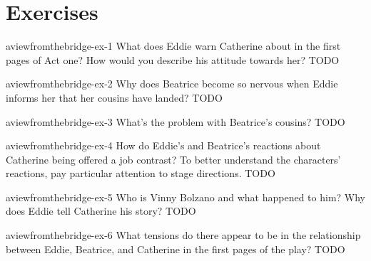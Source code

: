 \documentclass[preview]{standalone}
\begin{document}
\genpage

\section{Exercises}

\begin{snippetexercise}{aviewfromthebridge-ex-1}
{What does Eddie warn Catherine about in the first pages of Act one? How would you describe his
attitude towards her?}
TODO
\end{snippetexercise}

\begin{snippetexercise}{aviewfromthebridge-ex-2}
{Why does Beatrice become so nervous when Eddie informs her that her cousins have landed?}
TODO
\end{snippetexercise}

\begin{snippetexercise}{aviewfromthebridge-ex-3}
{What's the problem with Beatrice's cousins?}
TODO
\end{snippetexercise}

\begin{snippetexercise}{aviewfromthebridge-ex-4}
{How do Eddie's and Beatrice's reactions about Catherine being offered a job contrast? To better
understand the characters' reactions, pay particular attention to stage directions.}
TODO
\end{snippetexercise}

\begin{snippetexercise}{aviewfromthebridge-ex-5}
{Who is Vinny Bolzano and what happened to him? Why does Eddie tell Catherine his story?}
TODO
\end{snippetexercise}

\begin{snippetexercise}{aviewfromthebridge-ex-6}
{What tensions do there appear to be in the relationship between Eddie, Beatrice, and Catherine
in the first pages of the play?}
TODO
\end{snippetexercise}
\end{document}
